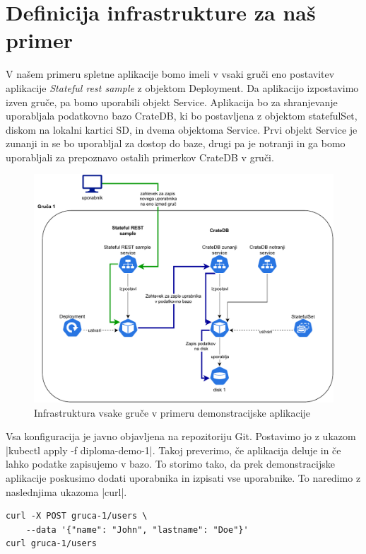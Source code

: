 \documentclass[a4paper, 12pt]{book}
\begin{document}
\section{Definicija infrastrukture za naš primer}
V našem primeru spletne aplikacije bomo imeli v vsaki gruči eno postavitev aplikacije \emph{Stateful rest sample} z objektom Deployment. 
Da aplikacijo izpostavimo izven gruče, pa bomo uporabili objekt Service.
Aplikacija bo za shranjevanje uporabljala podatkovno bazo CrateDB, ki bo postavljena z objektom statefulSet, diskom na lokalni kartici SD, in dvema objektoma Service.
Prvi objekt Service je zunanji in se bo uporabljal za dostop do baze, drugi pa je notranji in ga bomo uporabljali za prepoznavo ostalih primerkov CrateDB v gruči.
\begin{figure}[h]
\begin{center}
\includegraphics[width=1.0\textwidth]{images/infrastructure-example.pdf}
\end{center}
\caption{Infrastruktura vsake gruče v primeru demonstracijske aplikacije}
\label{infrastructure-example}
\end{figure}
Vsa konfiguracija je javno objavljena na repozitoriju Git\cite{git-diploma}.
Postavimo jo z ukazom \spverb|kubectl apply -f diploma-demo-1|.
Takoj preverimo, če aplikacija deluje in če lahko podatke zapisujemo v bazo.
To storimo tako, da prek demonstracijske aplikacije poskusimo dodati uporabnika in izpisati vse uporabnike.
To naredimo z naslednjima ukazoma \spverb|curl|.
\begin{verbatim}
curl -X POST gruca-1/users \
    --data '{"name": "John", "lastname": "Doe"}'
curl gruca-1/users
\end{verbatim}
\end{document}
